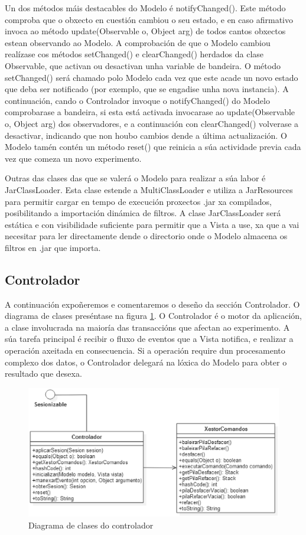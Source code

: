 Un dos métodos máis destacables do Modelo é notifyChanged(). Este método comproba que o obxecto en cuestión cambiou o seu estado, e en caso afirmativo invoca ao método update(Observable o, Object arg) de todos cantos obxectos estean observando ao Modelo. A comprobación de que o Modelo cambiou realízase cos métodos setChanged() e clearChanged() herdados da clase Observable, que activan ou desactivan unha variable de bandeira. O método setChanged() será chamado polo Modelo cada vez que este acade un novo estado que deba ser notificado (por exemplo, que se engadise unha nova instancia). A continuación, cando o Controlador invoque o notifyChanged() do Modelo comprobarase a bandeira, si esta está activada invocarase ao update(Observable o, Object arg) dos observadores, e a continuación con clearChanged() volverase a desactivar, indicando que non houbo cambios dende a última actualización. O Modelo tamén contén un método reset() que reinicia a súa actividade previa cada vez que comeza un novo experimento.

Outras das clases das que se valerá o Modelo para realizar a súa labor é JarClassLoader. Esta clase estende a MultiClassLoader e utiliza a JarResources para permitir cargar en tempo de execución proxectos .jar xa compilados, posibilitando a importación dinámica de filtros. A clase JarClassLoader será estática e con visibilidade suficiente para permitir que a Vista a use, xa que a vai necesitar para ler directamente dende o directorio onde o Modelo almacena os filtros en .jar que importa.

\subsection{Controlador}

A continuación expoñeremos e comentaremos o deseño da sección Controlador. O diagrama de clases preséntase na figura \ref{UMLcontrolador}. O Controlador é o motor da aplicación, a clase involucrada na maioría das transaccións que afectan ao experimento. A súa tarefa principal é recibir o fluxo de eventos que a Vista notifica, e realizar a operación axeitada en consecuencia. Si a operación require dun procesamento complexo dos datos, o Controlador delegará na lóxica do Modelo para obter o resultado que desexa.

\begin{figure}
\centering
\includegraphics[width=\textwidth,height=\textheight,keepaspectratio]{figuras/UMLcontrolador}
\caption{Diagrama de clases do controlador}
\label{UMLcontrolador}
\end{figure}

